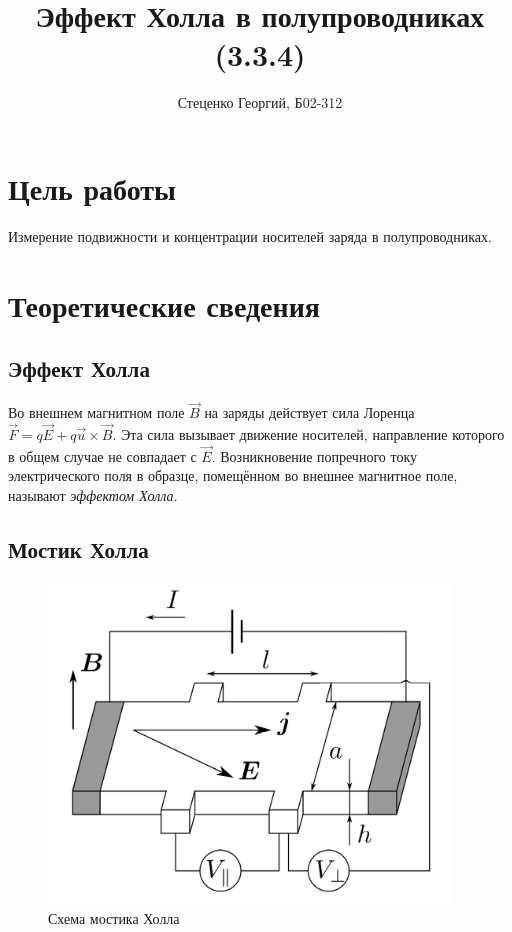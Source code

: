 \documentclass[12pt, a4paper]{article}
\title{Эффект Холла в полупроводниках (3.3.4)}
\author{Стеценко Георгий, Б02-312}
\date{}
\begin{document}
\maketitle

\section{Цель работы}
Измерение подвижности и концентрации носителей заряда в полупроводниках.


\section{Теоретические сведения}


\subsection*{Эффект Холла}

Во внешнем магнитном поле $\vec{B}$ на заряды действует сила Лоренца $\vec{F}=q\vec{E}+q\vec{u}\times\vec{B}$. Эта сила вызывает движение носителей, направление которого в общем случае не совпадает с $\vec{E}$. Возникновение попречного току электрического поля в образце, помещённом во внешнее магнитное поле, называют \textit{эффектом Холла}.

\subsection*{Мостик Холла}

\begin{figure}
  \centering
  \vspace{-15mm}
  \begin{center}
    \includegraphics[width=0.95\textwidth]{pics/th}
  \end{center}
  \caption{Схема мостика Холла}\label{fig:th}
\end{figure}
\end{document}
